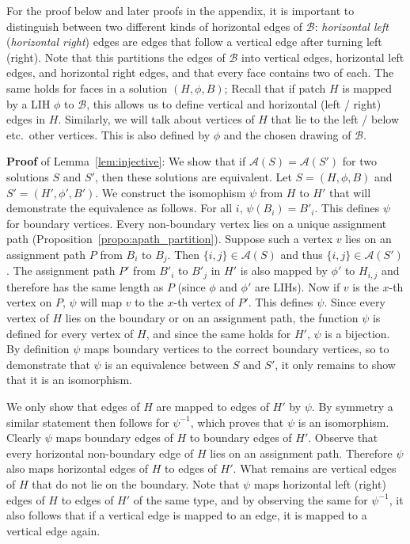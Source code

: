 \documentclass{llncs}
\def\term#1{{\em #1}\marginpar{\raggedright{\small\it #1}}}
\newcommand{\BW}{\mathcal{B}}
\newcommand{\AS}{\mathcal{A}}
\begin{document}
For the proof below and later proofs in the appendix, it is important to distinguish between two different kinds of horizontal edges of $\BW$: \term{horizontal left} (\term{horizontal right}) edges are edges that follow a vertical edge after turning left (right). Note that this partitions the edges of $\BW$ into vertical edges, horizontal left edges, and horizontal right edges, and that every face contains two of each. The same holds for faces in a solution $(H,\phi,B)$;
Recall that if patch $H$ is mapped by a LIH $\phi$ to $\BW$, this allows us to define vertical and horizontal (left / right) edges in $H$. Similarly, we will talk about vertices of $H$ that lie to the left / below etc.\ other vertices. This is also defined by $\phi$ and the chosen drawing of $\BW$.

\medskip

{\bf Proof} of Lemma~\ref{lem:injective}:
We show that if $\AS(S)=\AS(S')$ for two solutions $S$ and $S'$, then these solutions are equivalent.
Let $S=(H,\phi,B)$ and $S'=(H',\phi',B')$.
We construct the isomophism $\psi$ from $H$ to $H'$ that will demonstrate the equivalence as follows. For all $i$, $\psi(B_i)=B'_i$. This defines $\psi$ for boundary vertices. Every non-boundary vertex lies on a unique assignment path (Proposition~\ref{propo:apath_partition}). Suppose such a vertex $v$ lies on an assignment path $P$ from $B_i$ to $B_j$. Then $\{i,j\}\in \AS(S)$ and thus $\{i,j\}\in \AS(S')$. The assignment path $P'$ from $B'_i$ to $B'_j$ in $H'$ is also mapped by $\phi'$ to $H_{i,j}$ and therefore has the same length as $P$ (since $\phi$ and $\phi'$ are LIHs). Now if $v$ is the $x$-th vertex on $P$, $\psi$ will map $v$ to the $x$-th vertex of $P'$. This defines $\psi$. Since every vertex of $H$ lies on the boundary or on an assignment path, the function $\psi$ is defined for every vertex of $H$, and since the same holds for $H'$, $\psi$ is a bijection. By definition $\psi$ maps boundary vertices to the correct boundary vertices, so to demonstrate that $\psi$ is an equivalence between $S$ and $S'$, it only remains to show that it is an isomorphism.


We only show that edges of $H$ are mapped to edges of $H'$ by $\psi$. By symmetry a similar statement then follows for $\psi^{-1}$, which proves that $\psi$ is an isomorphism. Clearly $\psi$ maps boundary edges of $H$ to boundary edges of $H'$. Observe that every horizontal non-boundary edge of $H$ 
lies on an assignment path. Therefore $\psi$ also maps horizontal edges of $H$ to edges of $H'$. What remains are vertical edges of $H$ that do not lie on the boundary. Note that $\psi$ maps horizontal left (right) edges of $H$ to edges of $H'$ of the same type, and by observing the same for $\psi^{-1}$, it also follows that if a vertical edge is mapped to an edge, it is mapped to a vertical edge again.
\end{document}
